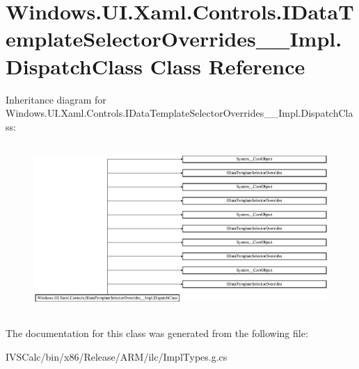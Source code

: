 \hypertarget{class_windows_1_1_u_i_1_1_xaml_1_1_controls_1_1_i_data_template_selector_overrides_____impl_1_1_dispatch_class}{}\section{Windows.\+U\+I.\+Xaml.\+Controls.\+I\+Data\+Template\+Selector\+Overrides\+\_\+\+\_\+\+Impl.\+Dispatch\+Class Class Reference}
\label{class_windows_1_1_u_i_1_1_xaml_1_1_controls_1_1_i_data_template_selector_overrides_____impl_1_1_dispatch_class}
Inheritance diagram for Windows.\+U\+I.\+Xaml.\+Controls.\+I\+Data\+Template\+Selector\+Overrides\+\_\+\+\_\+\+Impl.\+Dispatch\+Class\+:\begin{figure}[H]
\begin{center}
\leavevmode
\includegraphics[height=6.484210cm]{class_windows_1_1_u_i_1_1_xaml_1_1_controls_1_1_i_data_template_selector_overrides_____impl_1_1_dispatch_class}
\end{center}
\end{figure}


The documentation for this class was generated from the following file\+:\begin{DoxyCompactItemize}
\item 
I\+V\+S\+Calc/bin/x86/\+Release/\+A\+R\+M/ilc/Impl\+Types.\+g.\+cs\end{DoxyCompactItemize}
